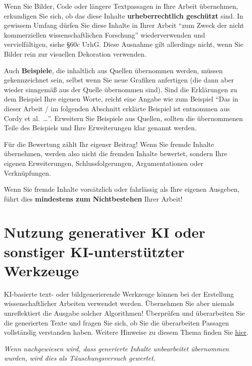 Wenn Sie Bilder, Code oder längere Textpassagen in Ihre Arbeit übernehmen, erkundigen Sie sich, ob das diese Inhalte \textbf{urheberrechtlich geschützt} sind. In gewissem Umfang dürfen Sie diese Inhalte in Ihrer Arbeit \enquote{zum Zweck der nicht kommerziellen wissenschaftlichen Forschung} wiederverwenden und vervielfältigen, siehe §60c UrhG. Diese Ausnahme gilt allerdings nicht, wenn Sie Bilder rein zur visuellen Dekoration verwenden.

Auch \textbf{Beispiele}, die inhaltlich aus Quellen übernommen werden, müssen gekennzeichnet sein, selbst wenn Sie neue Grafiken anfertigen (die dann aber wieder sinngemäß aus der Quelle übernommen sind). Sind die Erklärungen zu dem Beispiel Ihre eigenen Worte, reicht eine Angabe wie zum Beispiel "`Das in dieser Arbeit / im folgenden Abschnitt erklärte Beispiel ist entnommen aus Cordy et al.~\cite{Cordy2012}\ldots"'. Erweitern Sie Beispiele aus Quellen, sollten die übernommenen Teile des Beispiels und Ihre Erweiterungen klar genannt werden.

Für die Bewertung zählt Ihr eigener Beitrag! Wenn Sie fremde Inhalte übernehmen, werden also nicht die fremden Inhalte bewertet, sondern Ihre eigenen Erweiterungen, Schlussfolgerungen, Argumentationen oder Verknüpfungen.

Wenn Sie fremde Inhalte vorsätzlich oder fahrlässig als Ihre eigenen Ausgeben, führt dies \textbf{mindestens zum Nichtbestehen} Ihrer Arbeit!

\section{Nutzung generativer KI oder sonstiger KI-unterstützter Werkzeuge}
KI-basierte text- oder bildgenerierende Werkzeuge können bei der Erstellung wissenschaftlicher Arbeiten verwendet werden. Übernehmen Sie aber niemals unreflektiert die Ausgabe solcher Algorithmen! Überprüfen und überarbeiten Sie die generierten Texte und fragen Sie sich, ob Sie die überarbeiten Passagen vollständig verstanden haben. Weitere Hinweise zu diesem Thema finden Sie \hyperlink{https://research-and-innovation.ec.europa.eu/news/all-research-and-innovation-news/guidelines-responsible-use-generative-ai-research-developed-european-research-area-forum-2024-03-20_en}{hier}.
\par 
{\em Wenn nachgewiesen wird, dass generierte Inhalte unbearbeitet übernommen wurden, wird dies als Täuschungsversuch gewertet.}